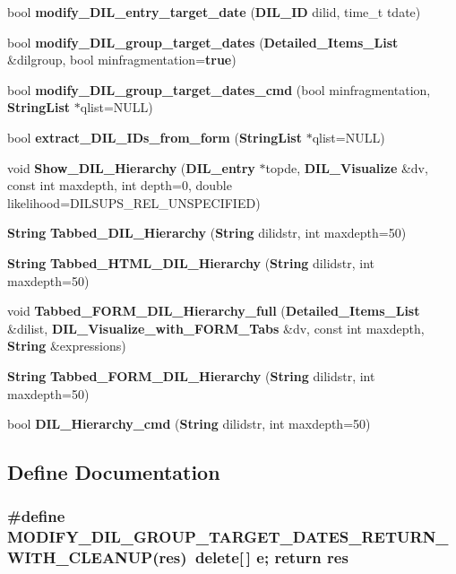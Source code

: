 \begin{CompactItemize}
\item 
bool {\bf modify\_\-DIL\_\-entry\_\-target\_\-date} ({\bf DIL\_\-ID} dilid, time\_\-t tdate)
\item 
bool {\bf modify\_\-DIL\_\-group\_\-target\_\-dates} ({\bf Detailed\_\-Items\_\-List} \&dilgroup, bool minfragmentation={\bf true})
\item 
bool {\bf modify\_\-DIL\_\-group\_\-target\_\-dates\_\-cmd} (bool minfragmentation, {\bf String\-List} $\ast$qlist=NULL)
\item 
bool {\bf extract\_\-DIL\_\-IDs\_\-from\_\-form} ({\bf String\-List} $\ast$qlist=NULL)
\item 
void {\bf Show\_\-DIL\_\-Hierarchy} ({\bf DIL\_\-entry} $\ast$topde, {\bf DIL\_\-Visualize} \&dv, const int maxdepth, int depth=0, double likelihood=DILSUPS\_\-REL\_\-UNSPECIFIED)
\item 
{\bf String} {\bf Tabbed\_\-DIL\_\-Hierarchy} ({\bf String} dilidstr, int maxdepth=50)
\item 
{\bf String} {\bf Tabbed\_\-HTML\_\-DIL\_\-Hierarchy} ({\bf String} dilidstr, int maxdepth=50)
\item 
void {\bf Tabbed\_\-FORM\_\-DIL\_\-Hierarchy\_\-full} ({\bf Detailed\_\-Items\_\-List} \&dilist, {\bf DIL\_\-Visualize\_\-with\_\-FORM\_\-Tabs} \&dv, const int maxdepth, {\bf String} \&expressions)
\item 
{\bf String} {\bf Tabbed\_\-FORM\_\-DIL\_\-Hierarchy} ({\bf String} dilidstr, int maxdepth=50)
\item 
bool {\bf DIL\_\-Hierarchy\_\-cmd} ({\bf String} dilidstr, int maxdepth=50)
\end{CompactItemize}


\subsection{Define Documentation}
\subsubsection{\setlength{\rightskip}{0pt plus 5cm}\#define MODIFY\_\-DIL\_\-GROUP\_\-TARGET\_\-DATES\_\-RETURN\_\-WITH\_\-CLEANUP({\bf res})\ delete[$\,$] e; return {\bf res}}\label{diladmin_8cc_a0}




